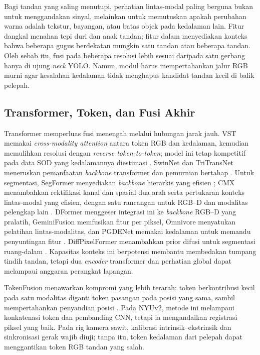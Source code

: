 Bagi tandan yang saling menutupi, perhatian lintas-modal paling berguna bukan
untuk menggandakan sinyal, melainkan untuk memutuskan apakah perubahan warna
adalah tekstur, bayangan, atau batas objek pada kedalaman lain. Fitur dangkal
menahan tepi duri dan anak tandan; fitur dalam menyediakan konteks bahwa
beberapa gugus berdekatan mungkin satu tandan atau beberapa tandan. Oleh sebab
itu, fusi pada beberapa resolusi lebih sesuai daripada satu gerbang hanya di
ujung \textit{neck} YOLO. Namun, modul harus mempertahankan jalur RGB murni
agar kesalahan kedalaman tidak menghapus kandidat tandan kecil di balik
pelepah.

\subsection{Transformer, Token, dan Fusi Akhir}

Transformer memperluas fusi menengah melalui hubungan jarak jauh. VST memakai
\textit{cross-modality attention} antara token RGB dan kedalaman, kemudian
memulihkan resolusi dengan \textit{reverse token-to-token}; model ini tetap
kompetitif pada data SOD yang kedalamannya diestimasi \cite{liu2021vst}.
SwinNet dan TriTransNet meneruskan pemanfaatan \textit{backbone} transformer
dan pemurnian bertahap \cite{liu2021swinnet,liu2021tritransnet}. Untuk
segmentasi, SegFormer menyediakan \textit{backbone} hierarkis yang efisien
\cite{xie2021segformer}; CMX menambahkan rektifikasi kanal dan spasial dua arah
serta pertukaran konteks lintas-modal yang efisien, dengan satu rancangan untuk
RGB--D dan modalitas pelengkap lain \cite{zhang2023cmx}. DFormer menggeser
integrasi ini ke \textit{backbone} RGB--D yang pralatih, GeminiFusion memfusikan
fitur per piksel, Omnivore menyatukan pelatihan lintas-modalitas, dan PGDENet
memakai kedalaman untuk memandu penyuntingan fitur \cite{yin2024dformer,jia2024geminifusion,girdhar2022omnivore,zhou2022pgdenet}.
DiffPixelFormer menambahkan prior difusi untuk segmentasi ruang-dalam
\cite{gong2025diffpixelformer}. Kapasitas konteks ini berpotensi membantu
membedakan tumpang tindih tandan, tetapi dua \textit{encoder} transformer dan
perhatian global dapat melampaui anggaran perangkat lapangan.

TokenFusion menawarkan kompromi yang lebih terarah: token berkontribusi kecil
pada satu modalitas diganti token pasangan pada posisi yang sama, sambil
mempertahankan penyandian posisi \cite{wang2022tokenfusion}. Pada NYUv2, metode
ini melampaui konkatenasi token dan pembanding CNN, tetapi ia mengandaikan
registrasi piksel yang baik. Pada rig kamera sawit, kalibrasi intrinsik--ekstrinsik
dan sinkronisasi gerak wajib diuji; tanpa itu, token kedalaman dari pelepah
dapat menggantikan token RGB tandan yang salah.

